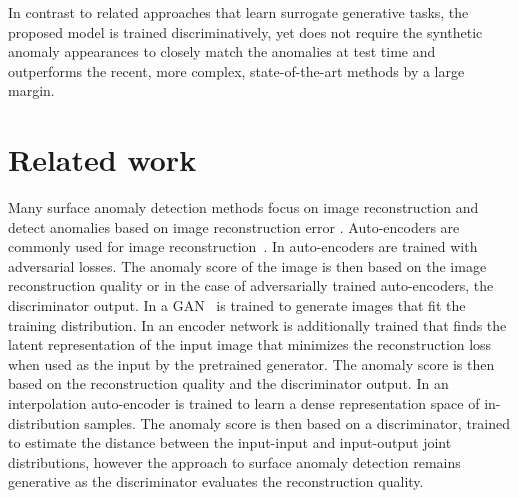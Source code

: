 \documentclass[10pt,twocolumn,letterpaper]{article}
\begin{document}
In contrast to related approaches that learn surrogate generative tasks, the proposed model is trained discriminatively, yet does not require the synthetic anomaly appearances to closely match the anomalies at test time and outperforms the recent, more complex, state-of-the-art methods by a large margin.


 











 






\section{Related work}
Many surface anomaly detection methods focus on image reconstruction and detect anomalies based on image reconstruction error \cite{akcay2018ganomaly,akccay2019skip,bergmann2018improving,schlegl2017unsupervised,schlegl2019f,tang2020anomaly,zavrtanik2020riad}. Auto-encoders are commonly used for image reconstruction~\cite{bergmann2018improving}. In \cite{akcay2018ganomaly,akccay2019skip,tang2020anomaly} auto-encoders are trained with adversarial losses. The anomaly score of the image is then based on the image reconstruction quality or in the case of adversarially trained auto-encoders, the discriminator output. In \cite{schlegl2017unsupervised,schlegl2019f} a GAN~\cite{goodfellow2014generative} is trained to generate images that fit the training distribution. In \cite{schlegl2019f} an encoder network is additionally trained that finds the latent representation of the input image that minimizes the reconstruction loss when used as the input by the pretrained generator. The anomaly score is then based on the reconstruction quality and the discriminator output. In \cite{wu2020mirrored} an interpolation auto-encoder is trained to learn a dense representation space of in-distribution samples. The anomaly score is then based on a discriminator, trained to estimate the distance between the input-input and input-output joint distributions, however the approach to surface anomaly detection remains generative as the discriminator evaluates the reconstruction quality.
\end{document}
